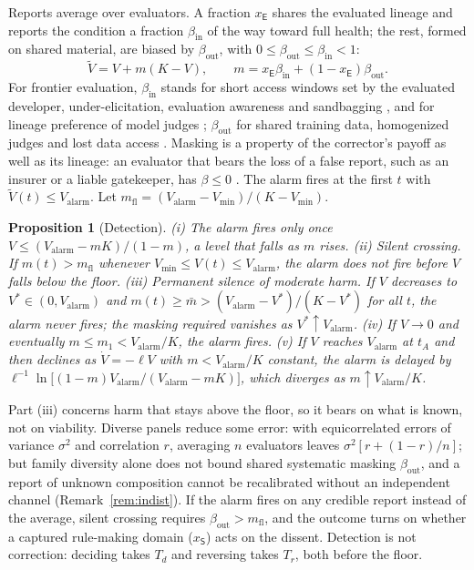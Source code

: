 \documentclass[letterpaper]{article} %
\newtheorem{proposition}{Proposition}
\theoremstyle{definition}
\newcommand{\dE}{\mathsf{E}}
\newcommand{\dS}{\mathsf{S}}
\newcommand{\Valarm}{V_{\mathrm{alarm}}}
\newcommand{\Vmin}{V_{\min}}
\newcommand{\mfl}{m_{\mathrm{fl}}}
\begin{document}
Reports average over evaluators. A fraction $x_\dE$ shares the evaluated lineage and reports the condition a fraction $\beta_{\mathrm{in}}$ of the way toward full health; the rest, formed on shared material, are biased by $\beta_{\mathrm{out}}$, with $0\le\beta_{\mathrm{out}}\le\beta_{\mathrm{in}}<1$:
\begin{equation}\label{eq:mask}
\tilde V=V+m(K-V),\qquad m=x_\dE\beta_{\mathrm{in}}+(1-x_\dE)\beta_{\mathrm{out}}.
\end{equation}
For frontier evaluation, $\beta_{\mathrm{in}}$ stands for short access windows set by the evaluated developer, under-elicitation, evaluation awareness and sandbagging \citep{metr2025o3,vanderweij2024,needham2025,bengio2026report}, and for lineage preference of model judges \citep{panickssery2024}; $\beta_{\mathrm{out}}$ for shared training data, homogenized judges and lost data access \citep{kleinberg2021,bommasani2022}. Masking is a property of the corrector's payoff as well as its lineage: an evaluator that bears the loss of a false report, such as an insurer or a liable gatekeeper, has $\beta\le0$ \citep{kraakman1986,benshahar2012}. The alarm fires at the first $t$ with $\tilde V(t)\le\Valarm$. Let $\mfl=(\Valarm-\Vmin)/(K-\Vmin)$.

\begin{proposition}[Detection]\label{prop:detect}
(i) The alarm fires only once $V\le(\Valarm-mK)/(1-m)$, a level that falls as $m$ rises. (ii) \emph{Silent crossing.} If $m(t)>\mfl$ whenever $\Vmin\le V(t)\le\Valarm$, the alarm does not fire before $V$ falls below the floor. (iii) \emph{Permanent silence of moderate harm.} If $V$ decreases to $V^\ast\in(0,\Valarm)$ and $m(t)\ge\bar m>(\Valarm-V^\ast)/(K-V^\ast)$ for all $t$, the alarm never fires; the masking required vanishes as $V^\ast\uparrow\Valarm$. (iv) If $V\to0$ and eventually $m\le m_1<\Valarm/K$, the alarm fires. (v) If $V$ reaches $\Valarm$ at $t_A$ and then declines as $\dot V=-\ell V$ with $m<\Valarm/K$ constant, the alarm is delayed by $\ell^{-1}\ln\big[(1-m)\Valarm/(\Valarm-mK)\big]$, which diverges as $m\uparrow\Valarm/K$.
\end{proposition}

Part (iii) concerns harm that stays above the floor, so it bears on what is known, not on viability. Diverse panels reduce some error: with equicorrelated errors of variance $\sigma^2$ and correlation $r$, averaging $n$ evaluators leaves $\sigma^2[r+(1-r)/n]$; but family diversity alone does not bound shared systematic masking $\beta_{\mathrm{out}}$, and a report of unknown composition cannot be recalibrated without an independent channel (Remark~\ref{rem:indist}). If the alarm fires on any credible report instead of the average, silent crossing requires $\beta_{\mathrm{out}}>\mfl$, and the outcome turns on whether a captured rule-making domain ($x_\dS$) acts on the dissent. Detection is not correction: deciding takes $T_d$ and reversing takes $T_r$, both before the floor.
\end{document}
